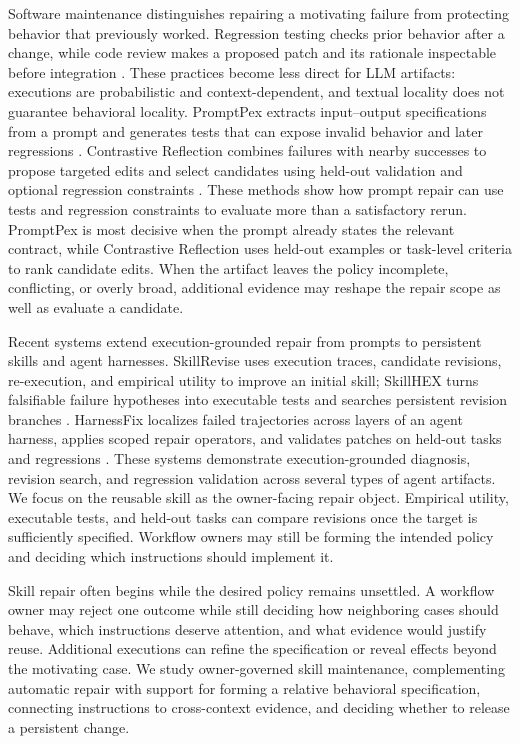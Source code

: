 Software maintenance distinguishes repairing a motivating failure from
protecting behavior that previously worked. Regression testing checks prior
behavior after a change, while code review makes a proposed patch and its
rationale inspectable before integration
\cite{rothermel1996regression,bacchelli2013review}. These practices become less
direct for LLM artifacts: executions are probabilistic and context-dependent,
and textual locality does not guarantee behavioral locality. PromptPex extracts
input--output specifications from a prompt and generates tests that can expose
invalid behavior and later regressions \cite{sharma2025promptpex}. Contrastive
Reflection combines failures with nearby successes to propose targeted edits and
select candidates using held-out validation and optional regression constraints
\cite{koh2026contrastive}. These methods show how prompt repair can use tests
and regression constraints to evaluate more than a satisfactory rerun.
PromptPex is most decisive when the prompt already states the relevant contract,
while Contrastive Reflection uses held-out examples or task-level criteria to
rank candidate edits. When the artifact leaves the policy incomplete,
conflicting, or overly broad, additional evidence may reshape the repair scope
as well as evaluate a candidate.

Recent systems extend execution-grounded repair from prompts to persistent
skills and agent harnesses. SkillRevise uses execution traces, candidate
revisions, re-execution, and empirical utility to improve an initial skill;
SkillHEX turns falsifiable failure hypotheses into executable tests and searches
persistent revision branches \cite{liu2026skillrevise,feng2026skillhex}.
HarnessFix localizes failed trajectories across layers of an agent harness,
applies scoped repair operators, and validates patches on held-out tasks and
regressions \cite{chen2026harnessfix}. These systems demonstrate
execution-grounded diagnosis, revision search, and regression validation across
several types of agent artifacts. We focus on the reusable skill as the
owner-facing repair object. Empirical utility, executable tests, and held-out
tasks can compare revisions once the target is sufficiently specified.
Workflow owners may still be forming the intended policy and deciding which
instructions should implement it.

Skill repair often begins while the desired policy remains unsettled. A
workflow owner may reject one outcome while still deciding how neighboring
cases should behave, which instructions deserve attention, and what evidence
would justify reuse. Additional executions can refine the specification or
reveal effects beyond the motivating case. We study owner-governed skill
maintenance, complementing automatic repair with support for forming a relative
behavioral specification, connecting instructions to cross-context evidence,
and deciding whether to release a persistent change.
